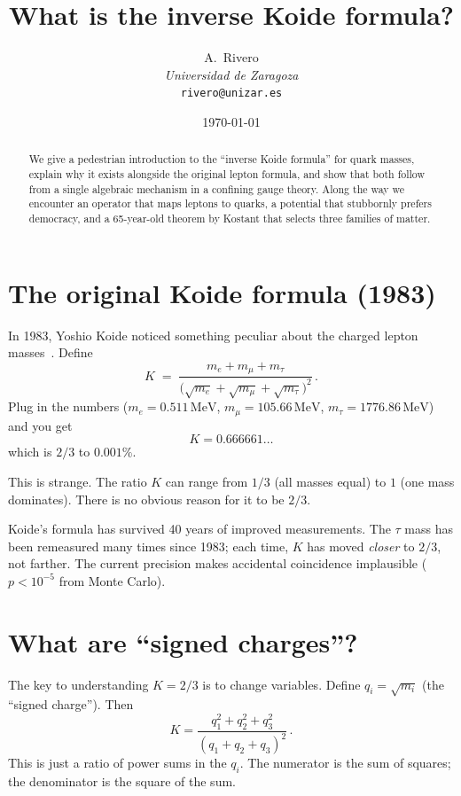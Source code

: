 \documentclass[11pt,a4paper]{article}
\title{What is the inverse Koide formula?}
\author{A.~Rivero\\
  \small\textit{Universidad de Zaragoza}\\
  \small\texttt{rivero@unizar.es}}
\date{\today}
\newcommand{\MeV}{\,\mathrm{MeV}}
\begin{document}
\maketitle

\begin{abstract}
We give a pedestrian introduction to the ``inverse Koide formula''
for quark masses, explain why it exists alongside the original
lepton formula, and show that both follow from a single algebraic
mechanism in a confining gauge theory.
Along the way we encounter an operator that maps leptons to quarks,
a potential that stubbornly prefers democracy, and a 65-year-old
theorem by Kostant that selects three families of matter.
\end{abstract}


\section{The original Koide formula (1983)}

In 1983, Yoshio Koide noticed something peculiar about the charged
lepton masses~\cite{Koide:1983}.
Define
\begin{equation}
  K \;=\; \frac{m_e + m_\mu + m_\tau}
  {\bigl(\sqrt{m_e} + \sqrt{m_\mu} + \sqrt{m_\tau}\bigr)^2}\,.
  \label{eq:K}
\end{equation}
Plug in the numbers ($m_e = 0.511\MeV$, $m_\mu = 105.66\MeV$,
$m_\tau = 1776.86\MeV$) and you get
\begin{equation}
  K = 0.666661\ldots
\end{equation}
which is $2/3$ to $0.001\%$.

This is strange. The ratio $K$ can range from $1/3$ (all masses equal)
to $1$ (one mass dominates). There is no obvious reason for it to be
$2/3$.

Koide's formula has survived 40 years of improved measurements.
The $\tau$ mass has been remeasured many times since 1983; each time,
$K$ has moved \emph{closer} to $2/3$, not farther.
The current precision makes accidental coincidence implausible
($p < 10^{-5}$ from Monte Carlo).


\section{What are ``signed charges''?}

The key to understanding $K = 2/3$ is to change variables.
Define $q_i = \sqrt{m_i}$ (the ``signed charge'').
Then
\begin{equation}
  K = \frac{q_1^2 + q_2^2 + q_3^2}{(q_1 + q_2 + q_3)^2}\,.
  \label{eq:Kq}
\end{equation}
This is just a ratio of power sums in the $q_i$.
The numerator is the sum of squares; the denominator is the
square of the sum.
\end{document}
